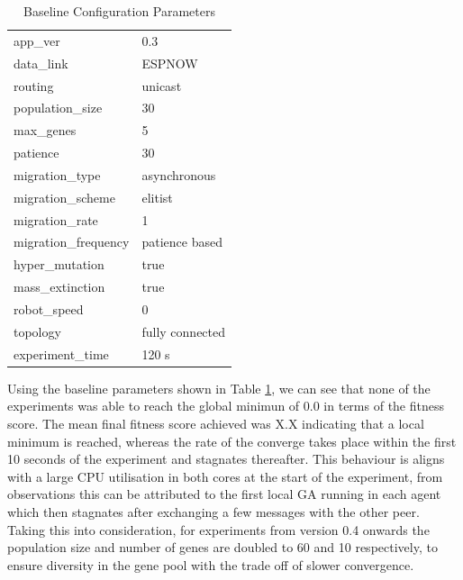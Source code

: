 \documentclass[conference]{IEEEtran}
\begin{document}
\begin{table}[h]
  \centering
  \caption{Baseline Configuration Parameters}
  \label{tab:base_config}
  \begin{tabular}{l@{~=~}l}
    app\_ver & 0.3\\
    data\_link & ESPNOW\\
    routing & unicast\\
    population\_size & 30\\
    max\_genes & 5\\
    patience & 30\\
    migration\_type & asynchronous\\
    migration\_scheme & elitist\\
    migration\_rate & 1\\
    migration\_frequency & patience based\\
    hyper\_mutation & true\\
    mass\_extinction & true\\
    robot\_speed & 0\\
    topology & fully connected\\
    experiment\_time & 120 s\\
  \end{tabular}
\end{table}

Using the baseline parameters shown in Table \ref{tab:base_config}, we can see that none of the experiments was able to reach the global minimun of 0.0 in terms of the fitness score. The mean final fitness score achieved was X.X indicating that a local minimum is reached, whereas the rate of the converge takes place within the first 10 seconds of the experiment and stagnates thereafter. This behaviour is aligns with a large CPU utilisation in both cores at the start of the experiment, from observations this can be attributed to the first local GA running in each agent which then stagnates after exchanging a few messages with the other peer. Taking this into consideration, for experiments from version 0.4 onwards the population size and number of genes are doubled to 60 and 10 respectively, to ensure diversity in the gene pool with the trade off of slower convergence.\\
\end{document}
